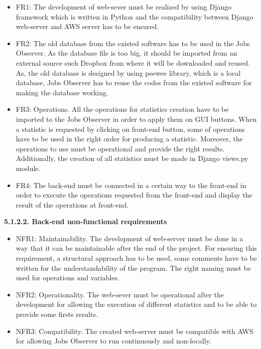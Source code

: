 \documentclass[conference,compsoc]{IEEEtran}
\begin{document}
\begin{itemize}
	\item FR1: The development of web-sever must be realized by using Django framework which is written in Python and the compatibility between Django web-server and AWS server has to be ensured. 
\newline

\item FR2: The old database from the existed software has to be used in the Jobs Observer. As the database file is too big, it should be imported from an external source such Dropbox from where it will be downloaded and reused. 
\newline
As, the old database is designed by using peewee library, which is a local database, Jobs Observer has to reuse the codes from the existed software for making the database working. 
\newline

\item FR3: Operations. All the operations for statistics creation have to be imported to the Jobs Observer in order to apply them on GUI buttons. When a statistic is requested by clicking on front-end button, some of operations have to be used in the right order for producing a statistic. 
\newline
Moreover, the operations to use must be operational and provide the right results. Additionally, the creation of all statistics must be made in Django views.py module. 
\newline

\item FR4: The back-end must be connected in a certain way to the front-end in order to execute the operations requested from the front-end and display the result of the operations at front-end. 
\end{itemize}

\noindent
\newline\newline
\textbf{5.1.2.2. Back-end non-functional requirements}
\newline

\begin{itemize}
\item NFR1: Maintainability. The development of web-server must be done in a way that it can be maintainable after the end of the project. For ensuring this requirement, a structural approach has to be used, some comments have to be written for the understandability of the program. The right naming must be used for operations and variables. 
\newline

\item NFR2: Operationality. The web-sever must be operational after the development for allowing the execution of different statistics and to be able to provide some firsts results. 
\newline

\item NFR3: Compatibility. The created web-server must be compatible with AWS for allowing Jobs Observer to run continuously and non-locally. 
\end{itemize}
\end{document}
